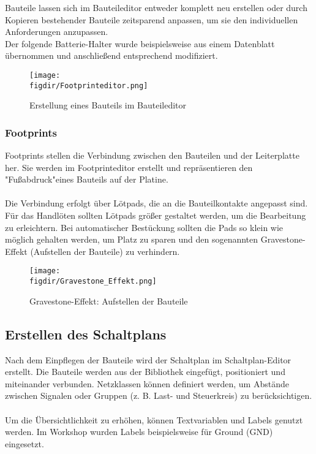 \noindent
Bauteile lassen sich im Bauteileditor entweder komplett neu erstellen oder durch Kopieren bestehender Bauteile zeitsparend anpassen, um sie den individuellen Anforderungen anzupassen.\\
Der folgende Batterie-Halter wurde beispielsweise aus einem Datenblatt übernommen und anschließend entsprechend modifiziert.

\begin{figure}[h]  
    \centering  
    \texttt{[image: \\figdir/Footprinteditor.png]}  
    \caption{Erstellung eines Bauteils im Bauteileditor} 
    \label{fig:Abbildung 7} 
\end{figure}  

\newpage

\subsubsection{Footprints}  
Footprints stellen die Verbindung zwischen den Bauteilen und der Leiterplatte her. Sie werden im Footprinteditor erstellt und repräsentieren den "Fußabdruck"{}eines Bauteils auf der Platine.\\
\\
Die Verbindung erfolgt über Lötpads, die an die Bauteilkontakte angepasst sind. Für das Handlöten sollten Lötpads größer gestaltet werden, um die Bearbeitung zu erleichtern.
Bei automatischer Bestückung sollten die Pads so klein wie möglich gehalten werden, um Platz zu sparen und den sogenannten Gravestone-Effekt (Aufstellen der Bauteile) zu verhindern.  

\begin{figure}[h]  
    \centering  
    \texttt{[image: \\figdir/Gravestone\_Effekt.png]}  
    \caption{Gravestone-Effekt: Aufstellen der Bauteile\cite{almit_grabstein_manhattan}}
    \label{fig:Abbildung 8}  
\end{figure}  
\newpage

\subsection{Erstellen des Schaltplans}  
Nach dem Einpflegen der Bauteile wird der Schaltplan im Schaltplan-Editor erstellt. Die Bauteile werden aus der Bibliothek eingefügt, positioniert und miteinander verbunden. Netzklassen können definiert werden, um Abstände zwischen Signalen oder Gruppen (z. B. Last- und Steuerkreis) zu berücksichtigen.\\  
\\
Um die Übersichtlichkeit zu erhöhen, können Textvariablen und Labels genutzt werden. Im Workshop wurden Labels beispielsweise für Ground (GND) eingesetzt.  

